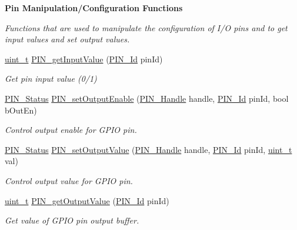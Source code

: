 \begin{Indent}{\bf Pin Manipulation/\+Configuration Functions}\par
{\em Functions that are used to manipulate the configuration of I/\+O pins and to get input values and set output values. }\begin{DoxyCompactItemize}
\item 
\hyperlink{_p_i_n_8h_a12a1e9b3ce141648783a82445d02b58d}{uint\+\_\+t} \hyperlink{_p_i_n_8h_a9bfcc2ddeaaac6dcd90d31ff0c125f3d}{P\+I\+N\+\_\+get\+Input\+Value} (\hyperlink{_p_i_n_8h_a9ae8197f460bb76ea09a84f47d09921f}{P\+I\+N\+\_\+\+Id} pin\+Id)
\begin{DoxyCompactList}\small\item\em Get pin input value (0/1) \end{DoxyCompactList}\item 
\hyperlink{_p_i_n_8h_abe0ad59bbf09e51fe37195a5e70b23f6}{P\+I\+N\+\_\+\+Status} \hyperlink{_p_i_n_8h_ace57b32daf13b67b2d8bb1b8470b5cd6}{P\+I\+N\+\_\+set\+Output\+Enable} (\hyperlink{_p_i_n_8h_afb2de52b054638f63c39df1f30a0d88d}{P\+I\+N\+\_\+\+Handle} handle, \hyperlink{_p_i_n_8h_a9ae8197f460bb76ea09a84f47d09921f}{P\+I\+N\+\_\+\+Id} pin\+Id, bool b\+Out\+En)
\begin{DoxyCompactList}\small\item\em Control output enable for G\+P\+I\+O pin. \end{DoxyCompactList}\item 
\hyperlink{_p_i_n_8h_abe0ad59bbf09e51fe37195a5e70b23f6}{P\+I\+N\+\_\+\+Status} \hyperlink{_p_i_n_8h_aa928e8e84148f7df7bfd2fb46e475016}{P\+I\+N\+\_\+set\+Output\+Value} (\hyperlink{_p_i_n_8h_afb2de52b054638f63c39df1f30a0d88d}{P\+I\+N\+\_\+\+Handle} handle, \hyperlink{_p_i_n_8h_a9ae8197f460bb76ea09a84f47d09921f}{P\+I\+N\+\_\+\+Id} pin\+Id, \hyperlink{_p_i_n_8h_a12a1e9b3ce141648783a82445d02b58d}{uint\+\_\+t} val)
\begin{DoxyCompactList}\small\item\em Control output value for G\+P\+I\+O pin. \end{DoxyCompactList}\item 
\hyperlink{_p_i_n_8h_a12a1e9b3ce141648783a82445d02b58d}{uint\+\_\+t} \hyperlink{_p_i_n_8h_a4a05603f0e075a37af59ed66fd6c6443}{P\+I\+N\+\_\+get\+Output\+Value} (\hyperlink{_p_i_n_8h_a9ae8197f460bb76ea09a84f47d09921f}{P\+I\+N\+\_\+\+Id} pin\+Id)
\begin{DoxyCompactList}\small\item\em Get value of G\+P\+I\+O pin output buffer. \end{DoxyCompactList}\item 

\end{DoxyCompactItemize}
\end{Indent}
